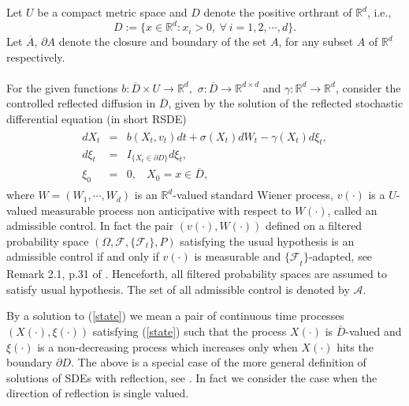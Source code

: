 \documentclass[11pt]{amsart}
\numberwithin{equation}{section}
\begin{document}
\vspace{.1in}

Let $U$ be a compact metric space and $D$ denote the positive orthrant of $\mathbb R^d$, i.e., 
$$D :=\{ x\in \mathbb R^d: x_i>0,\ \forall \ i=1,2,\cdots,d\}.$$ 
 Let $\overline{A}, \, \partial A$ denote the closure  and boundary of the set $A$, for any subset $A$ of $\mathbb{R}^d$ respectively. 
\paragraph{}  For the given functions $ b : \overline{D} \times U \longrightarrow \mathbb R^d,$ $
\sigma : \overline{D} \longrightarrow \mathbb R^{d\times d}$ and $\gamma : \mathbb R^d \longrightarrow \mathbb R^d $, consider the   controlled 
reflected diffusion in  $\overline { D}$, given by the solution of 
the reflected stochastic differential equation (in short RSDE)
\begin{eqnarray} \label{state}
\begin{array}{rcl}
\displaystyle{
 dX_t} &=& \displaystyle{ b(X_t,v_t)dt+\sigma(X_t) dW_t - \gamma(X_t)d\xi_t }, \\
\displaystyle{ d\xi_t }&=&  \displaystyle{  I_{\{X_t\in \partial {D} \}}d\xi_t  }, \\
\displaystyle{ \xi_0 } &=& \displaystyle{  0,\ \ \ \ X_0 = x\in \overline{D}, } 
\end{array}
\end{eqnarray}
where $W =(W_1,\cdots, W_d)$ is an $\mathbb R^d$-valued standard Wiener 
process, $v(\cdot)$ is a $U$-valued measurable process  non anticipative with respect to $W(\cdot)$,
called an admissible control. In fact the pair $(v(\cdot), W(\cdot))$ defined on a filtered probability 
space $(\Omega, \mathcal{F}, \{ \mathcal{F}_t \} , P)$ satisfying the usual hypothesis is an
 admissible control if and only if  $v(\cdot)$ is measurable and ${\{ \mathcal F}_t \}$-adapted, 
see Remark 2.1, p.31 of \cite{arapostathis_borkar_ghosh}.  Henceforth, all
filtered probability spaces are assumed to satisfy usual hypothesis.
The set of all admissible control is denoted by $\mathcal{A}$. 

 By a solution to (\ref{state})  we mean a pair of continuous time   processes 
 $(X(\cdot),\xi(\cdot))$ satisfying (\ref{state}) such that the process $X(\cdot)$ is 
$\overline { D}$-valued and  $\xi(\cdot)$ is 
a non-decreasing process which increases only when $X(\cdot)$ hits the boundary $\partial {D}$. 
The above is a special case of the more general definition of solutions of SDEs with reflection, 
see \cite{dupuis_ishii}. In fact we consider the  case when the direction of reflection is single valued.
\end{document}
